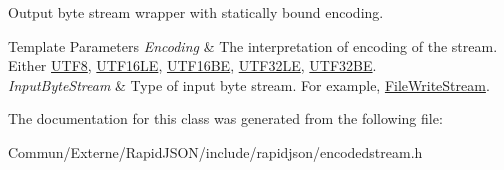 Output byte stream wrapper with statically bound encoding. 


\begin{DoxyTemplParams}{Template Parameters}
{\em Encoding} & The interpretation of encoding of the stream. Either \hyperlink{struct_u_t_f8}{U\+T\+F8}, \hyperlink{struct_u_t_f16_l_e}{U\+T\+F16\+LE}, \hyperlink{struct_u_t_f16_b_e}{U\+T\+F16\+BE}, \hyperlink{struct_u_t_f32_l_e}{U\+T\+F32\+LE}, \hyperlink{struct_u_t_f32_b_e}{U\+T\+F32\+BE}. \\
\hline
{\em Input\+Byte\+Stream} & Type of input byte stream. For example, \hyperlink{class_file_write_stream}{File\+Write\+Stream}. \\
\hline
\end{DoxyTemplParams}


The documentation for this class was generated from the following file\+:\begin{DoxyCompactItemize}
\item 
Commun/\+Externe/\+Rapid\+J\+S\+O\+N/include/rapidjson/encodedstream.\+h\end{DoxyCompactItemize}
